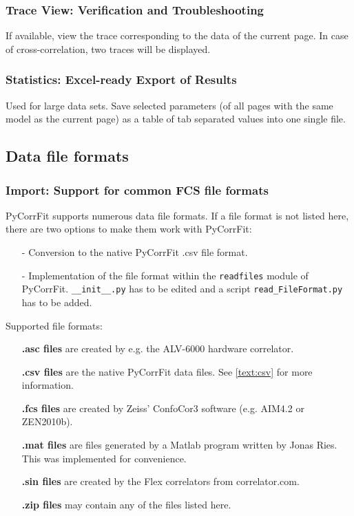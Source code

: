 \subsubsection{Trace View: Verification and Troubleshooting}
If available, view the trace corresponding to the data of the current page. In case of cross-correlation, two traces will be displayed.


\subsubsection{Statistics: Excel-ready Export of Results} Used for large data sets. Save selected parameters (of all pages with the same model as the current page) as a table of tab separated values into one single file.


\subsection{Data file formats}
\subsubsection{Import: Support for common FCS file formats}
\label{sec:fileformats}
PyCorrFit supports numerous data file formats. If a file format is not listed here, there are two options to make them work with PyCorrFit:
\begin{itemize}
\item[-] Conversion to the native PyCorrFit \mytilde .csv file format.
\item[-] Implementation of the file format within the \texttt{readfiles} module of PyCorrFit. \texttt{\_\_init\_\_.py} has to be edited and a script \texttt{read\_FileFormat.py} has to be added.
\end{itemize}

Supported file formats:
\begin{itemize}
\item[] \textbf{\mytilde .asc files} are created by e.g. the ALV-6000 hardware correlator.
\item[] \textbf{\mytilde .csv files} are the native PyCorrFit data files. See \ref{text:csv} for more information.
\item[] \textbf{\mytilde .fcs files} are created by Zeiss' ConfoCor3 software (e.g. AIM4.2 or ZEN2010b).
\item[] \textbf{\mytilde .mat files} are files generated by a Matlab program written by Jonas Ries. This was implemented for convenience.
\item[] \textbf{\mytilde .sin files} are created by the Flex correlators from correlator.com.
\item[] \textbf{\mytilde .zip files} may contain any of the files listed here.
\end{itemize}


